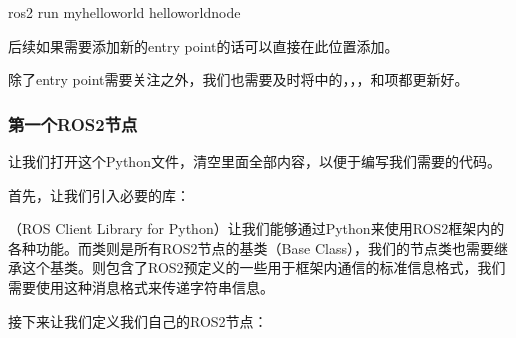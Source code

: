 \documentclass[letterpaper,10pt,english]{sphinxmanual}
\begin{document}
\begin{sphinxVerbatim}[commandchars=\\\{\}]
ros2 run my\PYGZus{}hello\PYGZus{}world hello\PYGZus{}world\PYGZus{}node
\end{sphinxVerbatim}

\sphinxAtStartPar
后续如果需要添加新的entry point的话可以直接在此位置添加。

\sphinxAtStartPar
除了entry
point需要关注之外，我们也需要及时将中的，，，和项都更新好。


\subsubsection{第一个ROS2节点}
\label{\detokenize{chapter_rl_sys/ros_code_ex:id5}}
\sphinxAtStartPar
让我们打开这个Python文件，清空里面全部内容，以便于编写我们需要的代码。

\sphinxAtStartPar
首先，让我们引入必要的库：

\begin{sphinxVerbatim}[commandchars=\\\{\}]
 
   

   
\end{sphinxVerbatim}

\sphinxAtStartPar
{}（ROS Client Library for
Python）让我们能够通过Python来使用ROS2框架内的各种功能。而类则是所有ROS2节点的基类（Base
Class），我们的节点类也需要继承这个基类。则包含了ROS2预定义的一些用于框架内通信的标准信息格式，我们需要使用这种消息格式来传递字符串信息。

\sphinxAtStartPar
接下来让我们定义我们自己的ROS2节点：
\end{document}
